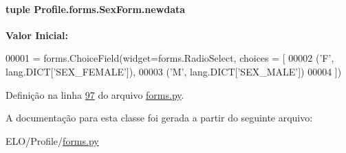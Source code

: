 \paragraph[{newdata}]{\setlength{\rightskip}{0pt plus 5cm}tuple Profile.\+forms.\+Sex\+Form.\+newdata\hspace{0.3cm}{\ttfamily [static]}}\label{classProfile_1_1forms_1_1SexForm_a0d99412ab99ee46149a50fabb2614845}
{\bfseries Valor Inicial\+:}
\begin{DoxyCode}
00001 = forms.ChoiceField(widget=forms.RadioSelect, choices = [
00002                                             (\textcolor{stringliteral}{'F'}, lang.DICT[\textcolor{stringliteral}{'SEX\_FEMALE'}]),
00003                                             (\textcolor{stringliteral}{'M'}, lang.DICT[\textcolor{stringliteral}{'SEX\_MALE'}])
00004                                                 ])
\end{DoxyCode}


Definição na linha \hyperlink{Profile_2forms_8py_source_l00097}{97} do arquivo \hyperlink{Profile_2forms_8py_source}{forms.\+py}.



A documentação para esta classe foi gerada a partir do seguinte arquivo\+:\begin{DoxyCompactItemize}
\item 
E\+L\+O/\+Profile/\hyperlink{Profile_2forms_8py}{forms.\+py}\end{DoxyCompactItemize}
